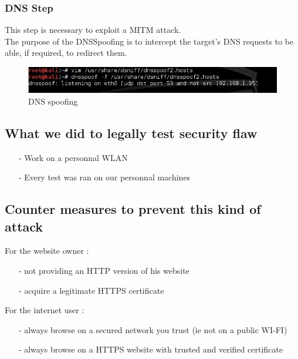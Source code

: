 \documentclass[a4paper, 11pt, oneside]{article}
\begin{document}
\subsubsection{DNS Step}
This step is necessary to exploit a MITM attack.\\
The purpose of the DNSSpoofing is to intercept the target's DNS requests to be able, if required, to redirect them.\\
\begin{figure}[!h]
	\centering
	\includegraphics[scale=0.80]{../images/dnsSpoof.jpg}
	\caption{DNS spoofing}
	\label{DNS_spoofing}
\end{figure}

\subsection{What we did to legally test security flaw}
\begin{itemize}
    \item[-] Work on a personnal WLAN\\
    \item[-] Every test was ran on our personnal machines\\
\end{itemize}

\subsection{Counter measures to prevent this kind of attack}
For the website owner : \\
\begin{itemize}
    \item[-] not providing an HTTP version of his website\\
    \item[-] acquire a legitimate HTTPS certificate\\
\end{itemize}

For the internet user : \\
\begin{itemize}
    \item[-] always browse on a secured network you trust (ie not on a public WI-FI)\\
    \item[-] always browse on a HTTPS website with trusted and verified certificate\\
\end{itemize}
\end{document}
